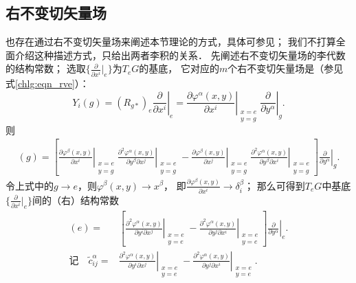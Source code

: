 





\subsection{右不变切矢量场}
也存在通过右不变切矢量场来阐述本节理论的方式，具体可参见\parencite[\S 6.1]{cc2001-zh}；
我们不打算全面介绍这种描述方式，只给出两者李积的关系．
先阐述右不变切矢量场的李代数的结构常数；
选取$\{\frac{\partial}{\partial x^i}|_{e}\}$为$T_eG$的基底，
它对应的$m$个右不变切矢量场是（参见式\eqref{chlg:eqn_rve}）：
\begin{equation}
    Y_i(g)=(R_{g*})_e \left. \frac{\partial }{\partial x^i }\right|_{e}
    = \left. \frac{\partial \varphi^\alpha (x,y)}{\partial x^i} 
    \right|_{\substack{x=e\\y=g}}   \left. \frac{\partial}{\partial y^\alpha}\right|_{g} .
\end{equation}
则 \setlength{\mathindent}{0em}
\begin{align*}
    [Y_i, Y_j](g)= \left[ \left. \frac{\partial \varphi^\beta (x,y)}{\partial x^i} \right|_{\substack{x=e\\y=g}}
    \left. \frac{\partial^2 \varphi^\alpha (x,y)}{\partial y^\beta \partial x^j} \right|_{\substack{x=e\\y=g}} 
    - \left. \frac{\partial \varphi^\beta (x,y)}{\partial x^j} \right|_{\substack{x=e\\y=g}}
    \left. \frac{\partial^2 \varphi^\alpha (x,y)}{\partial y^\beta \partial x^i} \right|_{\substack{x=e\\y=g}} 
    \right] \left. \frac{\partial}{\partial y^\alpha}\right|_{g} .
\end{align*}\setlength{\mathindent}{2em}
令上式中的$g\to e$，则$\varphi^\beta(x,y) \to x^\beta$，
即$\frac{\partial \varphi^\beta (x,y)}{\partial x^i}\to \delta^\beta_i$；
那么可得到$T_eG$中基底$\{\frac{\partial}{\partial x^i}|_{e}\}$间的（右）结构常数
\begin{align}
    [Y_i, Y_j](e)=& \left[ \left. \frac{\partial^2 \varphi^\alpha (x,y)}{\partial y^i \partial x^j} \right|_{\substack{x=e\\y=e}} 
    -\left. \frac{\partial^2 \varphi^\alpha (x,y)}{\partial y^j \partial x^i} \right|_{\substack{x=e\\y=e}} 
    \right] \left. \frac{\partial}{\partial y^\alpha}\right|_{e} . \\
    \text{记}\quad 
    \tilde{c}^\alpha_{ij}=&\left. \frac{\partial^2 \varphi^\alpha (x,y)}{\partial y^i \partial x^j} \right|_{\substack{x=e\\y=e}} -\left. 
    \frac{\partial^2 \varphi^\alpha (x,y)}{\partial y^j \partial x^i} \right|_{\substack{x=e\\y=e}} . \label{chlg:eqn_struc-const-R}
\end{align}
